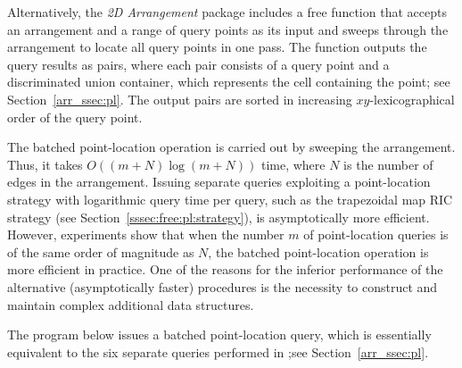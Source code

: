 Alternatively, the \emph{2D Arrangement} package includes a free
 function that accepts an arrangement and a range of
query points as its input and sweeps through the arrangement to
locate all query points in one pass. The function outputs the query
results as pairs, where each pair consists of a query point
and a discriminated union container, which represents the
cell containing the point; see Section~\ref{arr_ssec:pl}. The output
pairs are sorted in increasing $xy$-lexicographical order of the
query point.

The batched point-location operation is carried out by sweeping the
arrangement. Thus, it takes $O((m+N)\log{(m+N)})$  time, where $N$
is the number of edges in the arrangement. Issuing separate queries
exploiting a point-location strategy with logarithmic query time
per query, such as the trapezoidal map RIC strategy (see
Section~\ref{sssec:free:pl:strategy}), is asymptotically more
efficient. However, experiments show that when the number $m$ of
point-location queries is of the same order of magnitude as $N$,
the batched point-location operation is more efficient in practice. 
One of the reasons for the inferior performance of the alternative
(asymptotically faster) procedures is the necessity to construct
and maintain complex additional data structures.

The program below issues a batched point-location query, which
is essentially equivalent to the six separate queries performed in
;see Section~\ref{arr_ssec:pl}.

